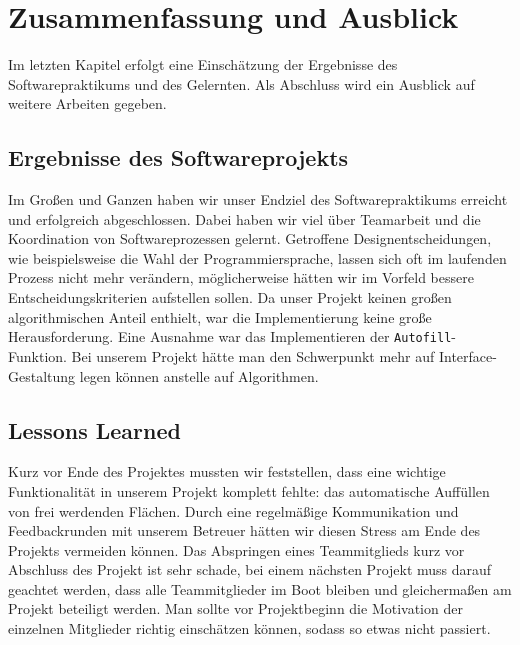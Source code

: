 \section{Zusammenfassung und Ausblick}
\label{sec:zusammenfassung}
Im letzten Kapitel erfolgt eine Einschätzung der Ergebnisse des Softwarepraktikums und des Gelernten. Als Abschluss wird ein Ausblick auf weitere Arbeiten gegeben.

\subsection{Ergebnisse des Softwareprojekts}
\label{subsec:ergebnisse}

Im Großen und Ganzen haben wir unser Endziel des Softwarepraktikums erreicht und erfolgreich abgeschlossen. Dabei haben wir viel über Teamarbeit und die Koordination von Softwareprozessen gelernt. Getroffene Designentscheidungen, wie beispielsweise die Wahl der Programmiersprache, lassen sich oft im laufenden Prozess nicht mehr verändern, möglicherweise hätten wir im Vorfeld bessere Entscheidungskriterien aufstellen sollen. Da unser Projekt keinen großen algorithmischen Anteil enthielt, war die Implementierung keine große Herausforderung. Eine Ausnahme war das Implementieren der \texttt{Autofill}-Funktion. Bei unserem Projekt hätte man den Schwerpunkt mehr auf Interface-Gestaltung legen können anstelle auf Algorithmen.

\subsection{Lessons Learned}
\label{subsec:lessons}

Kurz vor Ende des Projektes mussten wir feststellen, dass eine wichtige Funktionalität in unserem Projekt komplett fehlte: das automatische Auffüllen von frei werdenden Flächen. Durch eine regelmäßige Kommunikation und Feedbackrunden mit unserem Betreuer hätten wir diesen Stress am Ende des Projekts vermeiden können. 
Das Abspringen eines Teammitglieds kurz vor Abschluss des Projekt ist sehr schade, bei einem nächsten Projekt muss darauf geachtet werden, dass alle Teammitglieder im Boot bleiben und gleichermaßen am Projekt beteiligt werden. Man sollte vor Projektbeginn die Motivation der einzelnen Mitglieder richtig einschätzen können, sodass so etwas nicht passiert.

